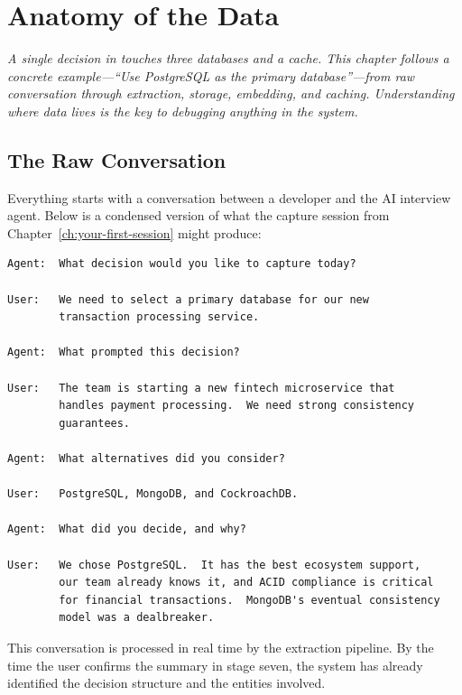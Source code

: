 \chapter{Anatomy of the Data}
\label{ch:anatomy-of-the-data}

\textit{A single decision in \sysname{} touches three databases and a cache.
This chapter follows a concrete example---``Use PostgreSQL as the primary
database''---from raw conversation through extraction, storage, embedding, and
caching.  Understanding where data lives is the key to debugging anything in
the system.}


\section{The Raw Conversation}
\label{sec:raw-conversation}

Everything starts with a conversation between a developer and the AI interview
agent.  Below is a condensed version of what the capture session from
Chapter~\ref{ch:your-first-session} might produce:

\begin{lstlisting}[style=bash, numbers=none, caption={A capture session about database selection (abridged).}]
Agent:  What decision would you like to capture today?

User:   We need to select a primary database for our new
        transaction processing service.

Agent:  What prompted this decision?

User:   The team is starting a new fintech microservice that
        handles payment processing.  We need strong consistency
        guarantees.

Agent:  What alternatives did you consider?

User:   PostgreSQL, MongoDB, and CockroachDB.

Agent:  What did you decide, and why?

User:   We chose PostgreSQL.  It has the best ecosystem support,
        our team already knows it, and ACID compliance is critical
        for financial transactions.  MongoDB's eventual consistency
        model was a dealbreaker.
\end{lstlisting}

This conversation is processed in real time by the extraction pipeline.  By the
time the user confirms the summary in stage seven, the system has already
identified the decision structure and the entities involved.


